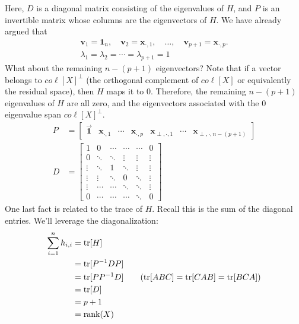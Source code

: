 \documentclass[12pt, a4paper]{article}
\theoremstyle{definition}
\begin{document}
	Here, $D$ is a diagonal matrix consisting of the eigenvalues of $H$, and
	$P$ is an invertible matrix whose columns are the eigenvectors of $H$.
	We have already argued that
	\begin{align*}
		\mathbf{v}_1=\mathbf{1}_n,\quad
		\mathbf{v}_2=\mathbf{x}_{\cdot, 1},\quad
		\ldots,\quad
		\mathbf{v}_{p+1}=\mathbf{x}_{\cdot, p}.\\
		\lambda_1=\lambda_2=\cdots=\lambda_{p+1}=1
	\end{align*}
	What about the remaining $n-(p+1)$ eigenvectors? Note that if a vector belongs to
	$co\ell[X]^\perp$ (the orthogonal complement of $co\ell[X]$ or equivalently the residual space),
	then $H$ maps it to $0$. Therefore, the remaining $n-(p+1)$ eigenvalues of $H$ are all zero,
	and the eigenvectors associated with the $0$ eigenvalue span $co\ell[X]^\perp$.
	\begin{align*}
		P&=\begin{bmatrix}
			\vec{\mathbf{1}} & \mathbf{x}_{\cdot, 1} & \cdots & \mathbf{x}_{\cdot, p}
			& \mathbf{x}_{\perp, \cdot, 1} & \cdots & \mathbf{x}_{\perp, \cdot, n-(p+1)}
		\end{bmatrix}\\
		D&=\begin{bmatrix}
			1 &0 & \cdots & \cdots &\cdots & 0\\
			0 & \ddots & \ddots & \vdots & \vdots & \vdots\\
			\vdots & \ddots & 1 & \ddots &\vdots & \vdots\\
			\vdots & \vdots & \ddots & 0 & \ddots & \vdots\\
			\vdots & \cdots & \cdots &\ddots  & \ddots & \vdots\\
			0 & \cdots & \cdots & \cdots & \ddots & 0
		\end{bmatrix}
	\end{align*}
	One last fact is related to the trace of $H$. Recall this is the sum of the diagonal
	entries. We'll leverage the diagonalization:
	\begin{align*}
		\sum_{i=1}^{n}h_{i,i}&=\text{tr}[H]\\
		&=\text{tr}[P^{-1}DP]\\
		&=\text{tr}[PP^{-1}D]
		\tag{$\text{tr}[ABC]=\text{tr}[CAB]=\text{tr}[BCA]$}\\
		&=\text{tr}[D]\\
		&=p+1\\
		&=\text{rank}(X)
	\end{align*}
	\pagebreak
	\printbibliography
\end{document}
